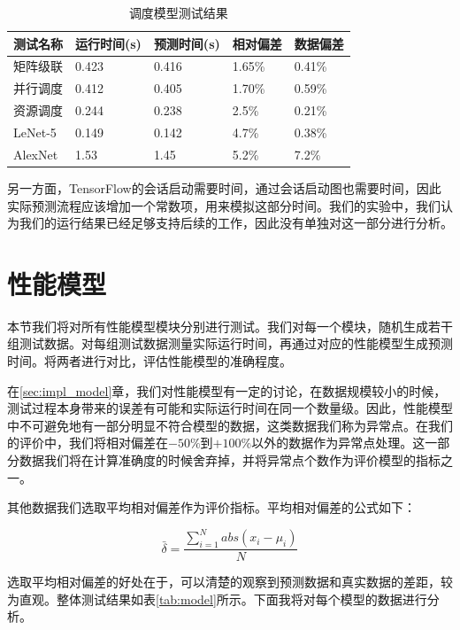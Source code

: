     \begin{table}[!htbp]
        \centering
	    \caption{调度模型测试结果}
        \label{tab:sche}
        \begin{tabular}{|l|l|l|l|l|}
            \hline
            测试名称 & 运行时间(s) & 预测时间(s) & 相对偏差 & 数据偏差\\
            \hline
            矩阵级联 & 0.423 & 0.416 & 1.65\% & 0.41\% \\
            \hline
            并行调度 & 0.412 & 0.405 & 1.70\% & 0.59\% \\
            \hline
            资源调度 & 0.244 & 0.238 & 2.5\% & 0.21\% \\
            \hline
            LeNet-5 & 0.149 & 0.142 & 4.7\% & 0.38\% \\
            \hline
            AlexNet & 1.53 & 1.45 & 5.2\% & 7.2\% \\
            \hline
        \end{tabular}
    \end{table}
    
    另一方面，TensorFlow的会话启动需要时间，通过会话启动图也需要时间，因此实际预测流程应该增加一个常数项，用来模拟这部分时间。我们的实验中，我们认为我们的运行结果已经足够支持后续的工作，因此没有单独对这一部分进行分析。
    
\section{性能模型}
    本节我们将对所有性能模型模块分别进行测试。我们对每一个模块，随机生成若干组测试数据。对每组测试数据测量实际运行时间，再通过对应的性能模型生成预测时间。将两者进行对比，评估性能模型的准确程度。
    
    在\ref{sec:impl_model}章，我们对性能模型有一定的讨论，在数据规模较小的时候，测试过程本身带来的误差有可能和实际运行时间在同一个数量级。因此，性能模型中不可避免地有一部分明显不符合模型的数据，这类数据我们称为异常点。在我们的评价中，我们将相对偏差在$ -50\% $到$ +100\% $以外的数据作为异常点处理。这一部分数据我们将在计算准确度的时候舍弃掉，并将异常点个数作为评价模型的指标之一。
    
    其他数据我们选取平均相对偏差作为评价指标。平均相对偏差的公式如下：
    
    $$
        \bar{\delta} = \frac{\sum_{i=1}^N abs(x_i - \mu_i)}{N}
    $$
    
    选取平均相对偏差的好处在于，可以清楚的观察到预测数据和真实数据的差距，较为直观。整体测试结果如表\ref{tab:model}所示。下面我将对每个模型的数据进行分析。

